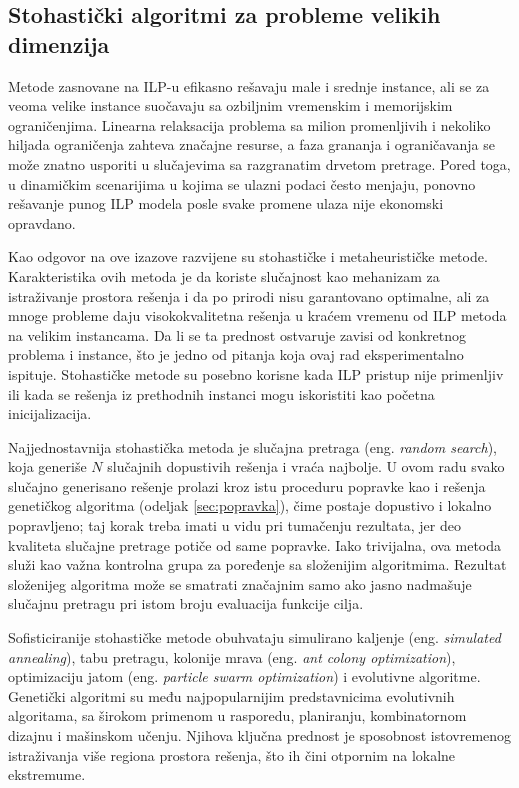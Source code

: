 \documentclass[12pt]{article}
\begin{document}
\subsection{Stohastički algoritmi za probleme velikih dimenzija}

Metode zasnovane na ILP-u efikasno rešavaju male i srednje instance, ali se za veoma velike instance suočavaju sa ozbiljnim vremenskim i memorijskim ograničenjima. Linearna relaksacija problema sa milion promenljivih i nekoliko hiljada ograničenja zahteva značajne resurse, a faza grananja i ograničavanja se može znatno usporiti u slučajevima sa razgranatim drvetom pretrage. Pored toga, u dinamičkim scenarijima u kojima se ulazni podaci često menjaju, ponovno rešavanje punog ILP modela posle svake promene ulaza nije ekonomski opravdano.

Kao odgovor na ove izazove razvijene su stohastičke i metaheurističke metode. Karakteristika ovih metoda je da koriste slučajnost kao mehanizam za istraživanje prostora rešenja i da po prirodi nisu garantovano optimalne, ali za mnoge probleme daju visokokvalitetna rešenja u kraćem vremenu od ILP metoda na velikim instancama. Da li se ta prednost ostvaruje zavisi od konkretnog problema i instance, što je jedno od pitanja koja ovaj rad eksperimentalno ispituje. Stohastičke metode su posebno korisne kada ILP pristup nije primenljiv ili kada se rešenja iz prethodnih instanci mogu iskoristiti kao početna inicijalizacija.

Najjednostavnija stohastička metoda je slučajna pretraga (eng. \textit{random search}), koja generiše $N$ slučajnih dopustivih rešenja i vraća najbolje. U ovom radu svako slučajno generisano rešenje prolazi kroz istu proceduru popravke kao i rešenja genetičkog algoritma (odeljak \ref{sec:popravka}), čime postaje dopustivo i lokalno popravljeno; taj korak treba imati u vidu pri tumačenju rezultata, jer deo kvaliteta slučajne pretrage potiče od same popravke. Iako trivijalna, ova metoda služi kao važna kontrolna grupa za poređenje sa složenijim algoritmima. Rezultat složenijeg algoritma može se smatrati značajnim samo ako jasno nadmašuje slučajnu pretragu pri istom broju evaluacija funkcije cilja.

Sofisticiranije stohastičke metode obuhvataju simulirano kaljenje (eng. \textit{simulated annealing}), tabu pretragu, kolonije mrava (eng. \textit{ant colony optimization}), optimizaciju jatom (eng. \textit{particle swarm optimization}) i evolutivne algoritme. Genetički algoritmi \cite{Holland1975, Goldberg1989, EibenSmith2015} su među najpopularnijim predstavnicima evolutivnih algoritama, sa širokom primenom u rasporedu, planiranju, kombinatornom dizajnu i mašinskom učenju. Njihova ključna prednost je sposobnost istovremenog istraživanja više regiona prostora rešenja, što ih čini otpornim na lokalne ekstremume.
\end{document}
